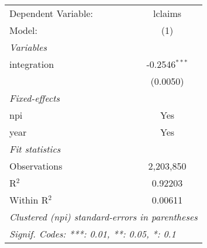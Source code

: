 
\begingroup
\centering
\begin{tabular}{lc}
   \tabularnewline \midrule \midrule
   Dependent Variable: & lclaims\\  
   Model:              & (1)\\  
   \midrule
   \emph{Variables}\\
   integration         & -0.2546$^{***}$\\   
                       & (0.0050)\\   
   \midrule
   \emph{Fixed-effects}\\
   npi                 & Yes\\  
   year                & Yes\\  
   \midrule
   \emph{Fit statistics}\\
   Observations        & 2,203,850\\  
   R$^2$               & 0.92203\\  
   Within R$^2$        & 0.00611\\  
   \midrule \midrule
   \multicolumn{2}{l}{\emph{Clustered (npi) standard-errors in parentheses}}\\
   \multicolumn{2}{l}{\emph{Signif. Codes: ***: 0.01, **: 0.05, *: 0.1}}\\
\end{tabular}
\par\endgroup


